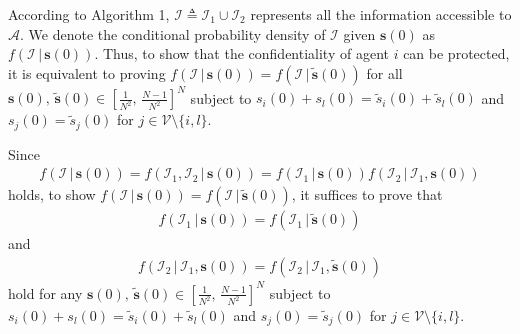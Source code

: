 \documentclass{IEEEtran}
\begin{document}
According to Algorithm 1, $\mathcal{I}\triangleq\mathcal{I}_1 \cup \mathcal{I}_2$ represents all the information accessible to $\mathcal{A}$. We denote the conditional probability density of $\mathcal{I}$ given $\mathbf{s}(0)$ as $f(\mathcal{I} \, | \, \mathbf{s}(0))$. Thus, to show that the confidentiality of agent $i$ can be protected, it is equivalent to proving $f(\mathcal{I} \, | \, \mathbf{s}(0)) = f(\mathcal{I} \, | \, \tilde{\mathbf{s}}(0))$ for all $\mathbf{s}(0), \, \tilde{\mathbf{s}}(0) \in [\frac{1}{N^2}, \, \frac{N-1}{N^2}]^N$ subject to $s_i(0) + s_l(0) = \tilde{s}_i(0) + \tilde{s}_l(0)$ and $s_j(0)=\tilde{s}_j(0)$ for $j\in \mathcal{V}\setminus \{i,l\}$.

Since 
\begin{equation}
	\begin{aligned}
		f(\mathcal{I} \, | \, \mathbf{s}(0)) = f(\mathcal{I}_1, \mathcal{I}_2 \, | \, \mathbf{s}(0)) = f(\mathcal{I}_1 \, | \, \mathbf{s}(0)) f(\mathcal{I}_2 \, | \, \mathcal{I}_1, \mathbf{s}(0))
	\end{aligned} 
\end{equation}
holds, to show $f(\mathcal{I} \, | \, \mathbf{s}(0)) = f(\mathcal{I} \, | \, \tilde{\mathbf{s}}(0))$, it suffices to prove that
\begin{equation}
	\begin{aligned}
		f(\mathcal{I}_1 \, | \, \mathbf{s}(0)) = f(\mathcal{I}_1 \, | \, \tilde{\mathbf{s}}(0))
	\end{aligned} 
\end{equation}
and
\begin{equation}
	\begin{aligned}
		f(\mathcal{I}_2 \, | \, \mathcal{I}_1, \mathbf{s}(0))= f(\mathcal{I}_2 \, | \, \mathcal{I}_1, \tilde{\mathbf{s}}(0))
	\end{aligned} 
\end{equation}
hold for any $\mathbf{s}(0), \, \tilde{\mathbf{s}}(0) \in [\frac{1}{N^2}, \, \frac{N-1}{N^2}]^N$ subject to $s_i(0) + s_l(0) = \tilde{s}_i(0) + \tilde{s}_l(0)$ and $s_j(0)=\tilde{s}_j(0)$ for $j\in \mathcal{V}\setminus \{i,l\}$.
\end{document}
